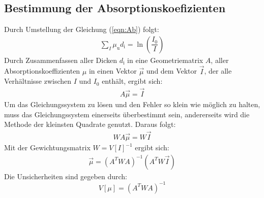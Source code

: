 \subsection{Bestimmung der Absorptionskoefizienten}
\noindent Durch Umstellung der Gleichung (\ref{eqn:Ab}) folgt:
\begin{align}
  \label{eqn:umab}
  \sum\limits_{I}^{}\mu_\mathrm{u} d_\mathrm{i} = \ln\left(\dfrac{I_\mathrm{0}}{I}\right)
\end{align}
Durch Zusammenfassen aller Dicken $d_\mathrm{i}$ in eine Geometriematrix $A$, aller Absorptionskoeffizienten $\mu$ in einen Vektor $\vec{\mu}$ und dem Vektor $\vec{I}$, der alle Verhältnisse zwischen $I$ und $I_\mathrm{0}$ enthält, ergibt sich:
\begin{align}
  \label{egn:Matrixschreibweise}
  A \vec{\mu} = \vec{I}
\end{align}
Um das Gleichungssystem zu lösen und den Fehler so klein wie möglich zu halten, muss das Gleichungssystem einerseits überbestimmt sein, andererseits wird die Methode der kleinsten Quadrate genutzt. Daraus folgt:
\begin{align}
  \label{eqn:Quadrate}
  W A \vec{\mu} = W \vec{I}
\end{align}
Mit der Gewichtungsmatrix $W=V[I]^{-1}$ ergibt sich:
\begin{align}
  \label{eqn:letzte Gleichung}
  \vec{\mu}=\left(A^TWA\right)^{-1}\left(A^TW\vec{I}\right)
\end{align}
Die Unsicherheiten sind gegeben durch:
\begin{equation}
  V[\mu]=\left(A^TWA\right)^{-1}
  \label{eqn:mu}
\end{equation}
